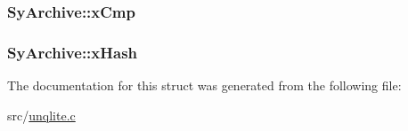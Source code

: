 \hypertarget{struct_sy_archive_a389b0f0d0630003065e9c51ef9f12e6f}{
\subsubsection[{x\-Cmp}]{ Sy\-Archive\-::x\-Cmp}}\label{dd/d4c/struct_sy_archive_a389b0f0d0630003065e9c51ef9f12e6f}
\hypertarget{struct_sy_archive_aab26c7c49101a068f76755fd35f98eea}{
\subsubsection[{x\-Hash}]{ Sy\-Archive\-::x\-Hash}}\label{dd/d4c/struct_sy_archive_aab26c7c49101a068f76755fd35f98eea}


The documentation for this struct was generated from the following file\-:\begin{DoxyCompactItemize}
\item 
src/\hyperlink{unqlite_8c}{unqlite.\-c}\end{DoxyCompactItemize}
